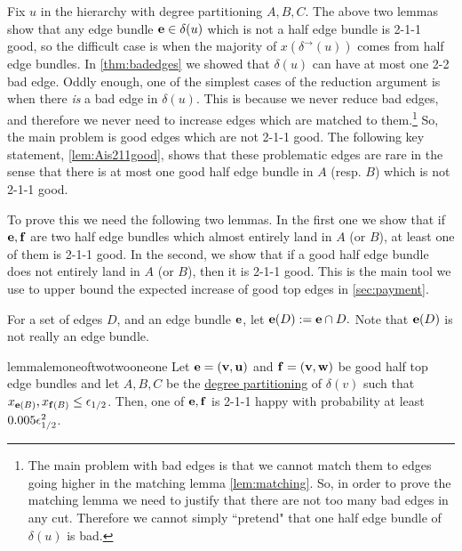 Fix $u$ in the hierarchy with degree partitioning $A,B,C$. The above two lemmas show that any edge bundle ${\bf e} \in \delta(u)$ which is not a half edge bundle is 2-1-1 good, so the difficult case is when the majority of $x(\delta^\rightarrow(u))$ comes from half edge bundles. In \cref{thm:badedges} we showed that $\delta(u)$ can have at most one 2-2 bad edge. Oddly enough, one of the simplest cases of the reduction argument is when there \textit{is} a bad edge in $\delta(u)$. This is because we never reduce bad edges, and therefore we never need to increase edges which are matched to them.\footnote{The main problem with bad edges is that we cannot match them to edges going higher in the matching lemma \ref{lem:matching}. So, in order to prove the matching lemma we need to justify that there are not too many bad edges in any cut. Therefore we cannot simply ``pretend" that one half edge bundle of $\delta(u)$ is bad.}
	So, the main problem is good edges which are not 2-1-1 good. The following key statement, \cref{lem:Ais211good}, shows that these problematic edges are rare in the sense that there is at most one good half edge bundle in $A$ (resp. $B$) which is not 2-1-1 good. 
 
 To prove this we need the following two lemmas. In the first one we show that if ${\bf e},{\bf f}$ are two half edge bundles which almost entirely land in $A$ (or $B$), at least one of them is 2-1-1 good. In the second, we show that if a good half edge bundle does not entirely land in $A$ (or $B$), then it is 2-1-1 good. This is the main tool we use to upper bound the expected increase of good top edges in \cref{sec:payment}.
 
For a set of edges $D$, and an edge bundle ${\bf e}$, let
${\bf e}(D):= {\bf e} \cap D.$ Note that ${\bf e}(D)$ is not really an edge bundle. 
 \begin{restatable}{lemma}{lemoneoftwotwooneone}
\label{lem:one-of-two-211}
Let ${\bf e}={\bf (v,u)}$ and ${\bf f}={\bf (v,w)}$ be good half top edge bundles and let $A,B,C$ be the \hyperlink{tar:degreepartition}{degree partitioning} of $\delta(v)$ such that $x_{{\bf e}(B)},x_{{\bf f}(B)}\leq {\epsilon}_{1/2}$.   
Then, one of ${\bf e},{\bf f}$ is 2-1-1 happy with probability at least $0.005{\epsilon}_{1/2}^2$.
\end{restatable}

